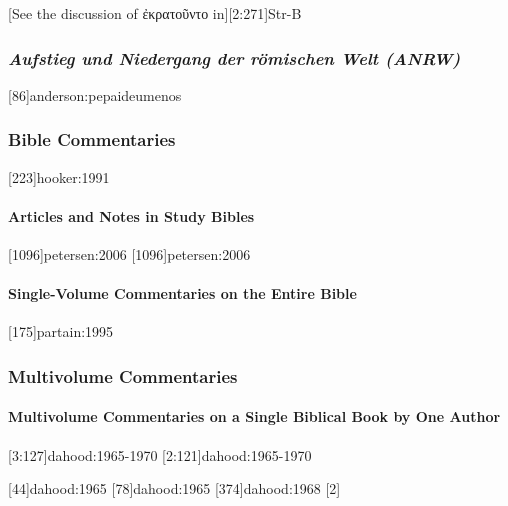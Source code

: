 \documentclass[a4paper]{article}
\newcommand{\textgreek}[1]{{\greekfont #1}}
\begin{document}
[See the discussion of \textgreek{ἐκρατοῦντο} in][2:271]{Str-B}

\subsubsection{\emph{Aufstieg und Niedergang der römischen Welt (ANRW)}}

[86]{anderson:pepaideumenos}

\subsubsection{Bible Commentaries}

[223]{hooker:1991}

\paragraph{Articles and Notes in Study Bibles}

[1096]{petersen:2006}
[1096]{petersen:2006}

\paragraph{Single-Volume Commentaries on the Entire Bible}

[175]{partain:1995}

\subsubsection{Multivolume Commentaries}

\paragraph{Multivolume Commentaries on a Single Biblical Book by One Author}

[3:127]{dahood:1965-1970}
[2:121]{dahood:1965-1970}

[44]{dahood:1965}
[78]{dahood:1965}
[374]{dahood:1968}
\bgroup
{}[2]{%
  }
\egroup
\end{document}
